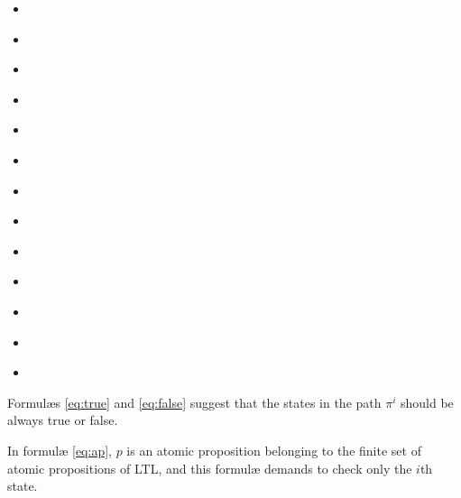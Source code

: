 \begin{itemize}
  \item {} \label{eq:true}
  \item {} \label{eq:false}
  \item {} \label{eq:ap}
  \item {} \label{eq:not}
  \item {} \label{eq:and}
  \item {} \label{eq:or}
  \item {} \label{eq:then}
  \item {} \label{eq:next}
  \item {} \label{eq:global}
  \item {} \label{eq:future}
  \item {} \label{eq:until}
  \item {} \label{eq:wuntil}
  \item {} \label{eq:release}
\end{itemize}

Formul\ae{}s \ref{eq:true} and \ref{eq:false} suggest that the states in the path $\pi^i$ should be always true or false.

In formul\ae{} \ref{eq:ap}, $p$ is an atomic proposition belonging to the finite set of atomic propositions of LTL, and this formul\ae{} demands to check only the $i$th state.


